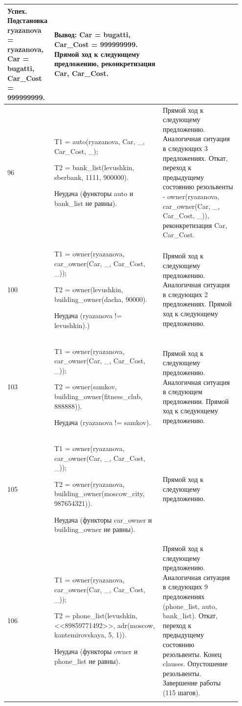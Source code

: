 \documentclass[a4paper,12pt]{article}
\begin{document}
\begin{center}
\begin{longtable}[h!]{|p{0.05\linewidth}|p{0.5\linewidth}|p{ 0.4\linewidth}|}
{	Успех. Подстановка ryazanova = ryazanova, Car = bugatti, Car\_Cost = 999999999.} & {Вывод: Car = bugatti, Car\_Cost = 999999999. Прямой ход к следующему предложению, реконкретизация Car, Car\_Cost.}\\
			\hline
			{96} & {T1 = auto(ryazanova, Car, \_, Car\_Cost, \_);
				
				T2 = bank\_list(levushkin, sberbank, 1111, 900000).
			
		Неудача (функторы auto и bank\_list не равны).} & {Прямой ход к следующему предложению. Аналогичная ситуация в следующих 3 предложениях. Откат, переход к предыдущему состоянию резольвенты - owner(ryazanova, car\_owner(Car, \_, Car\_Cost, \_)), реконкретизация Car, Car\_Cost.}\\
			\hline
			{100} & {T1 = owner(ryazanova, car\_owner(Car, \_, Car\_Cost, \_));
			
		T2 = owner(levushkin, building\_owner(dacha, 90000).
		
		Неудача (ryazanova != levushkin).)} & {Прямой ход к следующему предложению. Аналогичная ситуация в следующих 2 предложениях. Прямой ход к следующему предложению.}\\
			\hline
			{103} & {T1 = owner(ryazanova, car\_owner(Car, \_, Car\_Cost, \_));
				
				T2 = owner(samkov, building\_owner(fitness\_club, 888888)).
			
		Неудача (ryazanova != samkov).} & {Прямой ход к следующему предложению. Аналогичная ситуация в следующем предложении. Прямой ход к следующему предложению.}\\
			\hline
			{105} & {T1 = owner(ryazanova, car\_owner(Car, \_, Car\_Cost, \_));
				
				T2 = owner(ryazanova, building\_owner(moscow\_city, 987654321)).
			
		Неудача (функторы car\_owner и building\_owner не равны).} & {Прямой ход к следующему предложению.}\\
			\hline
			{106} & {T1 = owner(ryazanova, car\_owner(Car, \_, Car\_Cost, \_));
				
				T2 = phone\_list(levushkin, <<89859771492>>, adr(moscow, kantemirovskaya, 5, 1)).
				
				Неудача (функторы owner и phone\_list не равны).} & {Прямой ход к следующему предложению. Аналогичная ситуация в следующих 9 предложениях (phone\_list, auto, bank\_list). Откат, переход к предыдущему состоянию резольвенты. Конец clauses. Опустошение резольвенты. Завершение работы (115 шагов).}\\
			\hline
		\label{m2}
		\end{longtable}
	\end{center}
\end{document}
